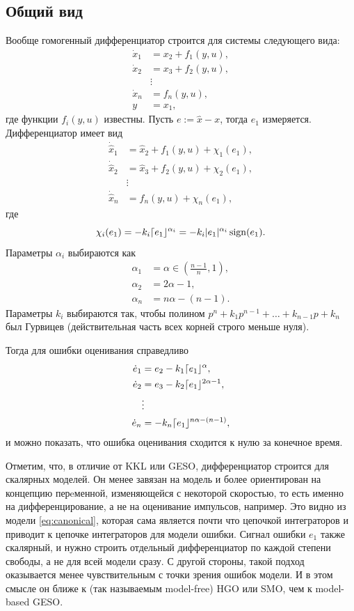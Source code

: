 \documentclass{article}
\newcommand{\sign}{\operatorname{sign}}
\DeclarePairedDelimiter{\homd}{\lceil}{\rfloor}
\begin{document}
\subsection{Общий вид}
Вообще гомогенный дифференциатор строится для системы следующего вида:
\begin{equation} \label{eq:canonical}
	\begin{aligned}
		\dot{x}_1 &= x_2 + f_1(y,u), \\
		\dot{x}_2 &= x_3 + f_2(y,u), \\		
		&\vdots \\
		\dot{x}_n &= f_n(y,u), \\
		y &= x_1,
	\end{aligned}
\end{equation}
где функции $f_i(y,u)$ известны. Пусть $e:=\hat{x}-x$, тогда $e_1$ измеряется. Дифференциатор имеет вид
\[
	\begin{aligned}
		\dot{\hat{x}}_1 &= \hat{x}_2 + f_1(y,u) + \chi_1(e_1), \\
		\dot{\hat{x}}_2 &= \hat{x}_3 + f_2(y,u) + \chi_2(e_1), \\
		&\vdots\\
		\dot{\hat{x}}_n &= f_n(y,u) + \chi_n(e_1),
	\end{aligned}
\]
где 
\[
	\chi_i(e_1) = -k_i \homd{e_1}^{\alpha_i} = -k_i |e_1|^{\alpha_i}\sign(e_1).
\]
Параметры $\alpha_i$ выбираются как
\[
	\begin{aligned}
		\alpha_1 &= \alpha \in \left(\frac{n-1}{n}, 1\right), \\
		\alpha_2 &= 2\alpha - 1,\\ 
		\alpha_n &= n\alpha - (n-1).
	\end{aligned}
\] 
Параметры $k_i$ выбираются так, чтобы полином $p^n+k_1p^{n-1}+\ldots + k_{n-1}p+k_n$ был Гурвицев (действительная часть всех корней строго меньше нуля). 

Тогда для ошибки оценивания справедливо
\[
	\begin{aligned}
		\dot{e}_1 &= e_2 - k_1\homd{e_1}^{\alpha}, \\
		\dot{e}_2 &= e_3 - k_2\homd{e_1}^{2\alpha-1}, \\		
		& \vdots \\
		\dot{e}_n &= - k_n\homd{e_1}^{n\alpha-(n-1)}, \\		
	\end{aligned}
\]
и можно показать, что ошибка оценивания сходится к нулю за конечное время. 

Отметим, что, в отличие от KKL или GESO, дифференциатор строится для скалярных моделей. Он менее завязан на модель и более ориентирован на концепцию перeменной, изменяющейся с некоторой скоростью, то есть именно на дифференцирование, а не на оценивание импульсов, например. Это видно из модели \eqref{eq:canonical}, которая сама является почти что цепочкой интеграторов и приводит к цепочке интеграторов для модели ошибки. Сигнал ошибки $e_1$ также скалярный, и нужно строить отдельный дифференциатор по каждой степени свободы, а не для всей модели сразу. С другой стороны, такой подход оказывается менее чувствительным с точки зрения ошибок модели. И в этом смысле он ближе к (так называемым model-free) HGO или SMO, чем к model-based GESO.
\end{document}
